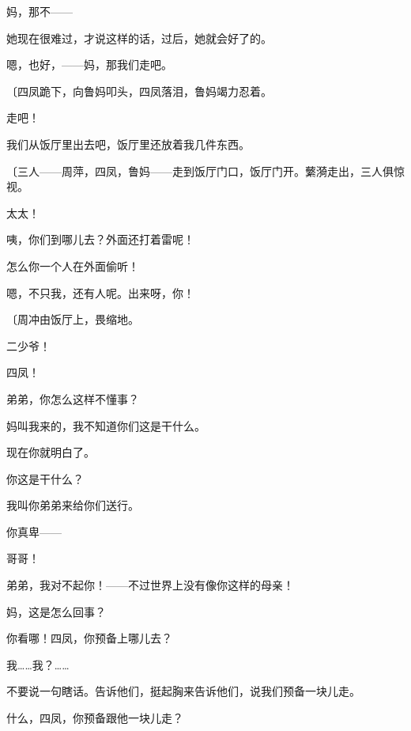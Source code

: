 妈，那不——

她现在很难过，才说这样的话，过后，她就会好了的。

嗯，也好，——妈，那我们走吧。

{\fangsong〔四凤跪下，向鲁妈叩头，四凤落泪，鲁妈竭力忍着。}

走吧！

我们从饭厅里出去吧，饭厅里还放着我几件东西。

{\fangsong〔三人——周萍，四凤，鲁妈——走到饭厅门口，饭厅门开。蘩漪走出，三人俱惊视。}

太太！

咦，你们到哪儿去？外面还打着雷呢！

怎么你一个人在外面偷听！

嗯，不只我，还有人呢。出来呀，你！

{\fangsong〔周冲由饭厅上，畏缩地。}

二少爷！

四凤！

弟弟，你怎么这样不懂事？

妈叫我来的，我不知道你们这是干什么。

现在你就明白了。

你这是干什么？

我叫你弟弟来给你们送行。

你真卑——

哥哥！

弟弟，我对不起你！——不过世界上没有像你这样的母亲！

妈，这是怎么回事？

你看哪！四凤，你预备上哪儿去？

我……我？……

不要说一句瞎话。告诉他们，挺起胸来告诉他们，说我们预备一块儿走。

什么，四凤，你预备跟他一块儿走？

